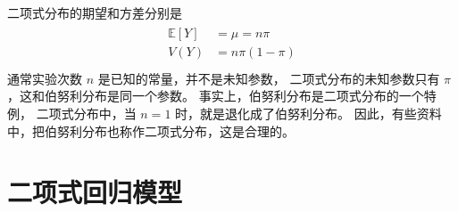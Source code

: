 \documentclass[letterpaper,10pt,english]{sphinxmanual}
\begin{document}
二项式分布的期望和方差分别是
\begin{align}\label{equation:二项模型/content:二项模型/content:23}\!\begin{aligned}
\mathbb{E}[Y] &= \mu = n \pi\\
V(Y) &= n \pi(1-\pi)\\
\end{aligned}\end{align}
通常实验次数 \(n\) 是已知的常量，并不是未知参数，
二项式分布的未知参数只有 \(\pi\)
，这和伯努利分布是同一个参数。
事实上，伯努利分布是二项式分布的一个特例，
二项式分布中，当 \(n=1\) 时，就是退化成了伯努利分布。
因此，有些资料中，把伯努利分布也称作二项式分布，这是合理的。


\section{二项式回归模型}
\label{\detokenize{_u4e8c_u9879_u6a21_u578b/content:id7}}
\end{document}
